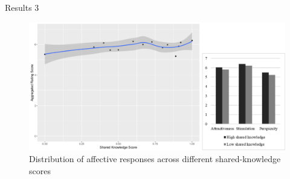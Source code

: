 \begin{frame}[allowframebreaks]{Results 3}
    \begin{figure}[tb]
     \begin{center}
      \includegraphics[width=120mm]{images/rqb_affective-response-redraw.pdf}
      \end{center}
      \caption{Distribution  of  affective  responses  across  different  shared-knowledge scores}
      \label{learn-effective}  
    \end{figure}
\end{frame}
